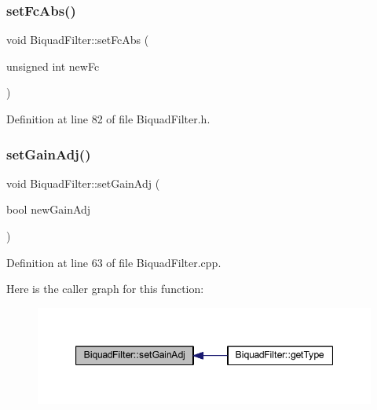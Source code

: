 \subsubsection{\texorpdfstring{set\+Fc\+Abs()}{setFcAbs()}}
{\footnotesize\ttfamily void Biquad\+Filter\+::set\+Fc\+Abs (\begin{DoxyParamCaption}\item[{unsigned int}]{new\+Fc }\end{DoxyParamCaption})\hspace{0.3cm}{\ttfamily [inline]}}



Definition at line 82 of file Biquad\+Filter.\+h.

\mbox{\label{class_biquad_filter_a8d742032c260e7b5fefddf2cde94facb}} 
\subsubsection{\texorpdfstring{set\+Gain\+Adj()}{setGainAdj()}}
{\footnotesize\ttfamily void Biquad\+Filter\+::set\+Gain\+Adj (\begin{DoxyParamCaption}\item[{bool}]{new\+Gain\+Adj }\end{DoxyParamCaption})}



Definition at line 63 of file Biquad\+Filter.\+cpp.

Here is the caller graph for this function\+:
\nopagebreak
\begin{figure}[H]
\begin{center}
\leavevmode
\includegraphics[width=347pt]{d9/d6f/class_biquad_filter_a8d742032c260e7b5fefddf2cde94facb_icgraph}
\end{center}
\end{figure}
\mbox{\label{class_biquad_filter_a57c5069dadf75d44783a2fb20dadfbc4}} 
